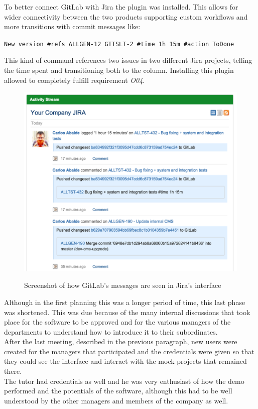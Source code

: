 	To better connect GitLab with Jira the plugin \cite{gitlab-listener} was installed.
	This allows for wider connectivity between the two products supporting custom workflows and more transitions with commit messages like:
	\begin{center}
		\texttt{New version \#refs ALLGEN-12 GTTSLT-2 \#time 1h 15m \#action ToDone}
	\end{center}
	This kind of command references two issues in two different Jira projects, telling the time spent and transitioning both to the  column.
	Installing this plugin allowed to completely fulfill requirement \textit{O04}.
	\begin{figure}[H]
		\centering
		\includegraphics[width=.7\textwidth]{resources/aiaiai}\\
		\caption[Screenshot of how GitLab's messages are seen in Jira's interface]{Screenshot of how GitLab's messages are seen in Jira's interface\cite{gitlab-listener}}
	\end{figure}
	Although in the first planning this was a longer period of time, this last phase was shortened.
	This was due because of the many internal discussions that took place for the software to be approved and for the various managers of the departments to understand how to introduce it to their subordinates.\\
	After the last meeting, described in the previous paragraph, new users were created for the managers that participated and the credentials were given so that they could see the interface and interact with the mock projects that remained there.\\
	The tutor had credentials as well and he was very enthusiast of how the demo performed and the potentials of the software, although this had to be well understood by the other managers and members of the company as well.\\
